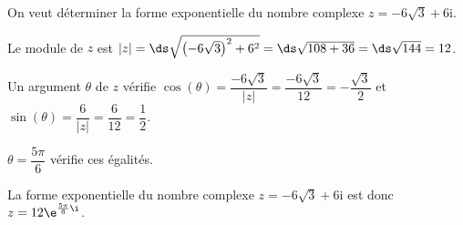 \medskip

On veut déterminer la forme exponentielle du nombre complexe 
$z = - 6\sqrt 3 + 6\text{i}.$

\begin{list}{\textbullet}{}
\item Le module de $z$ est $|z| = \ds\sqrt{\left(-6\sqrt{3}\right )^2 + 6^2 } = \ds\sqrt{108+36} = \ds\sqrt{144}=12$.

\item Un argument $\theta$ de $z$ vérifie $\cos\left (\theta\right )=\dfrac{-6\sqrt{3}}{|z|} = \dfrac{-6\sqrt{3}}{12} = -\dfrac{\sqrt{3}}{2}$ et $\sin\left (\theta\right )=\dfrac{6}{|z|} = \dfrac{6}{12} = \dfrac{1}{2}$.

$\theta = \dfrac{5\pi}{6}$ vérifie ces égalités.
\end{list}

La forme exponentielle du nombre complexe 
$z = - 6\sqrt 3 + 6\text{i}$
est donc $z = 12 \e^{\frac{5\pi}{6}\i}$.

\bigskip

